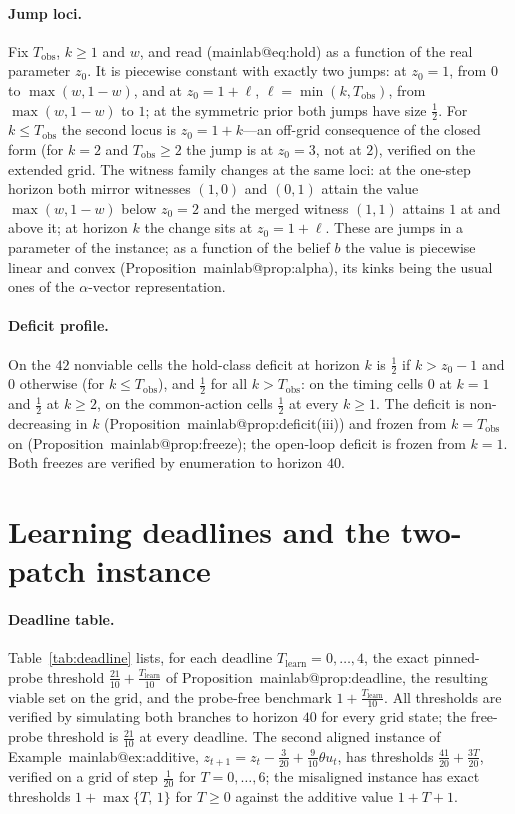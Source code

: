 \documentclass[11pt,a4paper]{article}
\makeatletter
\theoremstyle{plain}
\theoremstyle{definition}
\theoremstyle{remark}
\newcommand{\Tobs}{T_{\mathrm{obs}}}
\newcommand{\Tl}{T_{\mathrm{learn}}}
\newcommand{\tfr}[2]{\tfrac{#1}{#2}}
\newcommand{\mref}[1]{\csname mainlab@#1\endcsname}
\newcommand{\meqref}[1]{(\mref{#1})}
\makeatother
\begin{document}
\paragraph{Jump loci.} Fix $\Tobs$, $k\ge1$ and $w$, and read \meqref{eq:hold} as a function of the real parameter $z_0$. It is piecewise constant with exactly two jumps: at $z_0=1$, from $0$ to $\max(w,1-w)$, and at $z_0=1+\ell$, $\ell=\min(k,\Tobs)$, from $\max(w,1-w)$ to $1$; at the symmetric prior both jumps have size $\tfr12$. For $k\le\Tobs$ the second locus is $z_0=1+k$---an off-grid consequence of the closed form (for $k=2$ and $\Tobs\ge2$ the jump is at $z_0=3$, not at $2$), verified on the extended grid. The witness family changes at the same loci: at the one-step horizon both mirror witnesses $(1,0)$ and $(0,1)$ attain the value $\max(w,1-w)$ below $z_0=2$ and the merged witness $(1,1)$ attains $1$ at and above it; at horizon $k$ the change sits at $z_0=1+\ell$. These are jumps in a parameter of the instance; as a function of the belief $b$ the value is piecewise linear and convex (Proposition~\mref{prop:alpha}), its kinks being the usual ones of the $\alpha$-vector representation.

\paragraph{Deficit profile.} On the $42$ nonviable cells the hold-class deficit at horizon $k$ is $\tfr12$ if $k>z_0-1$ and $0$ otherwise (for $k\le\Tobs$), and $\tfr12$ for all $k>\Tobs$: on the timing cells $0$ at $k=1$ and $\tfr12$ at $k\ge2$, on the common-action cells $\tfr12$ at every $k\ge1$. The deficit is non-decreasing in $k$ (Proposition~\mref{prop:deficit}(iii)) and frozen from $k=\Tobs$ on (Proposition~\mref{prop:freeze}); the open-loop deficit is frozen from $k=1$. Both freezes are verified by enumeration to horizon $40$.
\section{Learning deadlines and the two-patch instance}\label{si:deadline}

\paragraph{Deadline table.} Table~\ref{tab:deadline} lists, for each deadline $\Tl=0,\dots,4$, the exact pinned-probe threshold $\tfr{21}{10}+\tfr{\Tl}{10}$ of Proposition~\mref{prop:deadline}, the resulting viable set on the grid, and the probe-free benchmark $1+\tfr{\Tl}{10}$. All thresholds are verified by simulating both branches to horizon $40$ for every grid state; the free-probe threshold is $\tfr{21}{10}$ at every deadline. The second aligned instance of Example~\mref{ex:additive}, $z_{t+1}=z_t-\tfr3{20}+\tfr9{10}\theta u_t$, has thresholds $\tfr{41}{20}+\tfr{3T}{20}$, verified on a grid of step $\tfr1{20}$ for $T=0,\dots,6$; the misaligned instance has exact thresholds $1+\max\{T,\,1\}$ for $T\ge0$ against the additive value $1+T+1$.
\end{document}
